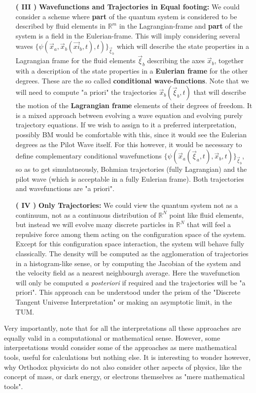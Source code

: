 \documentclass[11pt, a4paper]{article} %
\newcommand{\R}{\mathbb{R}} %
\begin{document}
\begin{enumerate}
\item[{\bf ( III )}]{\bf Wavefunctions and Trajectories in Equal footing: } We could consider a scheme where {\bf part} of the quantum system is considered to be described by fluid elements in $\R^m$ in the Lagrangian-frame and {\bf part} of the system is a field in the Eulerian-frame. This will imply considering several waves $\{ \psi(\vec{x}_a, \vec{x}_b(\vec{xi}_b,t), t) \}_{\vec{\xi}_b}$ which will describe the state properties in a Lagrangian frame for the fluid elements $\vec{\xi}_b$ describing the axes $\vec{x}_b$, together with a description of the state properties in a {\bf Eulerian frame} for the other degrees. These are the so called {\bf conditional wave-functions}. Note that we will need to compute "a priori" the trajectories $\vec{x}_b(\vec{\xi}_b,t)$ that will describe the motion of the {\bf Lagrangian frame} elements of their degrees of freedom. It is a mixed approach between evolving a wave equation and evolving purely trajectory equations. If we wish to assign to it a preferred interpretation, possibly BM would be comfortable with this, since it would see the Eulerian degrees as the Pilot Wave itself. For this however, it would be necessary to define complementary conditional wavefunctions $\{ \psi(\vec{x}_a(\vec{\xi}_a,t), \vec{x}_b, t) \}_{\vec{\xi}_b}$, so as to get simulatneously, Bohmian trajectories (fully Lagrangian) and the pilot wave (which is acceptable in a fully Eulerian frame). Both trajectories and wavefunctions are "a priori".


\item[\bf ( IV ) ]{\bf Only Trajectories: } We could view the quantum system not as a continuum, not as a continuous distribution of $\R^N$ point like fluid elements, but instead we will evolve many discrete particles in $\R^N$ that will feel a repulsive force among them acting on the configuration space of the system. Except for this configuration space interaction, the system will behave fully classically. The density will be computed as the agglomeration of trajectories in a histogram-like sense, or by computing the Jacobian of the system and the velocity field as a nearest neighbourgh average. Here the wavefunction will only be computed {\em a posteriori} if required and the trajectories will be "a priori". This approach can be understood under the prism of the "Discrete Tangent Universe Interpretation" or making an asymptotic limit, in the TUM.

\end{enumerate}
Very importantly, note that for all the interpretations all these approaches are equally valid in a computational or mathematical sense. However, some interpretations would consider some of the approaches as mere mathematical tools, useful for calculations but nothing else. It is interesting to wonder however, why Orthodox physicists do not also consider other aspects of physics, like the concept of mass, or dark energy, or electrons themselves as "mere mathematical tools".
\end{document}
